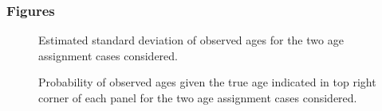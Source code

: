 \documentclass[11pt]{book}
\begin{document}
\hypertarget{figures-1}{%
\subsubsection{Figures}\label{figures-1}}
\begin{figure}[htb]

{\centering {} 

}

\caption{Estimated standard deviation of observed ages for the two age assignment cases considered.}\label{fig:unnamed-chunk-30}
\end{figure}
\newpage
\begin{figure}[htb]

{\centering {} 

}

\caption{Probability of observed ages given the true age indicated in top right corner of each panel for the two age assignment cases considered.}\label{fig:unnamed-chunk-31}
\end{figure}
\end{document}
